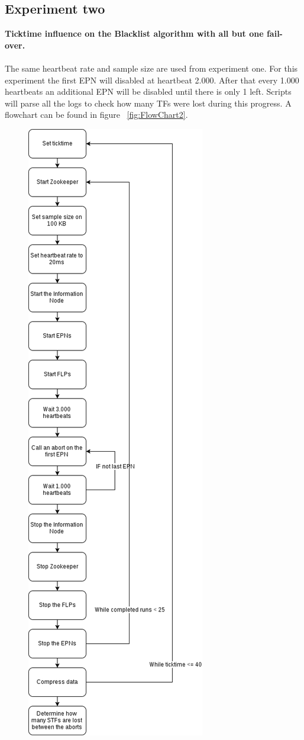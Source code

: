 \newpage
\subsection{Experiment two}
\textbf{Ticktime influence on the Blacklist algorithm with all but one fail-over.}
\\~\\
The same heartbeat rate and sample size are used from experiment one. For this experiment the first EPN will disabled at heartbeat 2.000. After that every 1.000 heartbeats an additional EPN will be disabled until there is only 1 left. Scripts will parse all the logs to check how many TFs were lost during this progress. A flowchart can be found in figure ~\ref{fig:FlowChart2}.

\begin{figure}[htb]
    \centering
    \includegraphics[scale=0.3]{./graphics/ex2.png}

\end{figure}
